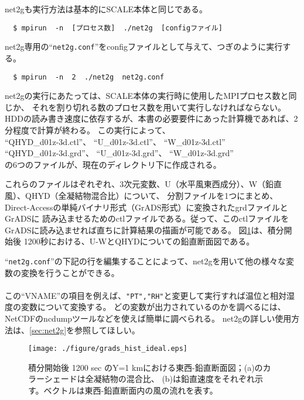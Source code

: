 net2gも実行方法は基本的にSCALE本体と同じである。
\begin{verbatim}
  $ mpirun  -n  [プロセス数]  ./net2g  [configファイル]
\end{verbatim}
net2g専用の``\verb|net2g.conf|''をconfigファイルとして与えて、つぎのように実行する。
\begin{verbatim}
  $ mpirun  -n  2  ./net2g  net2g.conf
\end{verbatim}

\noindent net2gの実行にあたっては、SCALE本体の実行時に使用したMPIプロセス数と同じか、
それを割り切れる数のプロセス数を用いて実行しなければならない。
HDDの読み書き速度に依存するが、本書の必要要件にあった計算機であれば、2分程度で計算が終わる。
この実行によって、\\
``QHYD\_d01z-3d.ctl''、 ``U\_d01z-3d.ctl''、 ``W\_d01z-3d.ctl''\\
``QHYD\_d01z-3d.grd''、 ``U\_d01z-3d.grd''、 ``W\_d01z-3d.grd''\\
の6つのファイルが、現在のディレクトリ下に作成される。

これらのファイルはぞれぞれ、3次元変数、U（水平風東西成分）、W（鉛直風）、QHYD（全凝結物混合比）について、
分割ファイルを1つにまとめ、Direct-Accessの単純バイナリ形式（GrADS形式）に変換されたgrdファイルとGrADSに
読み込ませるためのctlファイルである。従って、このctlファイルをGrADSに読み込ませれば直ちに計算結果の描画が可能である。
図\ref{fig_ideal}は、積分開始後 1200秒における、U-WとQHYDについての鉛直断面図である。


``\verb|net2g.conf|''の下記の行を編集することによって、net2gを用いて他の様々な変数の変換を行うことができる。\\

{\small {\gt
{}}}\\

\noindent この``VNAME''の項目を例えば、\verb|"PT","RH"|と変更して実行すれば温位と相対湿度の変数について変換する。
どの変数が出力されているのかを調べるには、NetCDFのncdumpツールなどを使えば簡単に調べられる。
net2gの詳しい使用方法は、\ref{sec:net2g}を参照してほしい。


\begin{figure}[t]
\begin{center}
  \texttt{[image: ./figure/grads\_hist\_ideal.eps]}\\
  \caption{積分開始後 1200 sec のY=1 kmにおける東西-鉛直断面図；(a)のカラーシェードは全凝結物の混合比、
           (b)は鉛直速度をそれぞれ示す。ベクトルは東西-鉛直断面内の風の流れを表す。}
  \label{fig_ideal}
\end{center}
\end{figure}

